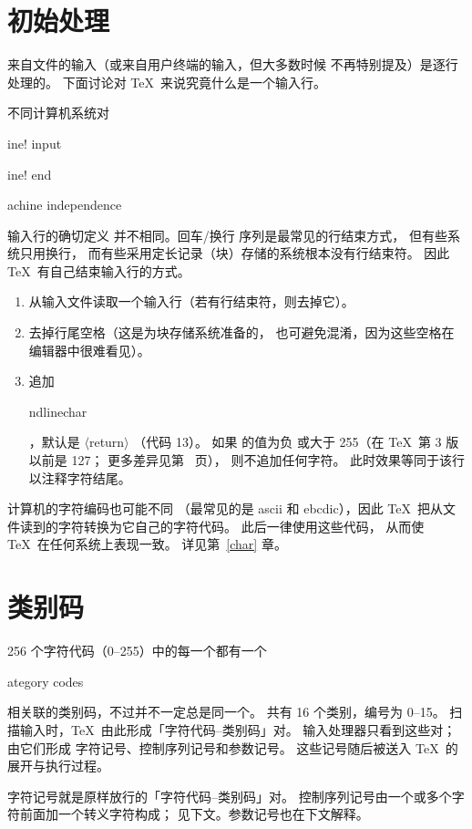 \documentclass[a4paper]{rapport3}
\makeatletter
\def\gr#1{$\langle$#1$\rangle$}\def\key#1{{\tt#1}}
\def\ascii{{\sc ascii}}
\def\ebcdic{{\sc ebcdic}}
\def\gram#1{\gr{#1}}%
\def\term#1\par{\index{#1}}
\def\cstoidx#1\par{\index{#1@\cs{#1}}}
\makeatother
\begin{document}
\section{初始处理}

来自文件的输入（或来自用户终端的输入，但大多数时候
不再特别提及）是逐行处理的。
下面讨论对 \TeX\ 来说究竟什么是一个输入行。

不同计算机系统对
\term line! input\par\term line! end\par\term machine independence\par
输入行的确切定义
\mdqon
并不相同。回车/换行
\mdqoff
\awp
{}%
序列是最常见的行结束方式，
但有些系统只用换行，
而有些采用定长记录（块）存储的系统根本没有行结束符。
因此 \TeX\ 有自己结束输入行的方式。

\begin{enumerate}
\item 从输入文件读取一个输入行（若有行结束符，则去掉它）。
\item 去掉行尾空格（这是为块存储系统准备的，
      也可避免混淆，因为这些空格在编辑器中很难看见）。
\item 追加 \cstoidx endlinechar\par，默认是 \gram{return}
      （代码 13）。
      如果  的值为负
\label{append:elc}%
      或大于 255（在 \TeX\ 第 3 版以前是 127；
      更多差异见第~\pageref{2vs3} 页），
      则不追加任何字符。
      此时效果等同于该行以注释字符结尾。
\end{enumerate}


计算机的字符编码也可能不同
（最常见的是 \ascii{} 和 \ebcdic{}），因此 \TeX\
把从文件读到的字符转换为它自己的字符代码。
此后一律使用这些代码，
从而使 \TeX\ 在任何系统上表现一致。
详见第~\ref{char} 章。

\section{类别码}

256 个字符代码（0--255）中的每一个都有一个
\term category codes\par
相关联的类别码，不过并不一定总是同一个。
共有 16 个类别，编号为 0--15。
扫描输入时，\TeX\ 由此形成「字符代码--类别码」对。
输入处理器只看到这些对；由它们形成
字符记号、控制序列记号和参数记号。
这些记号随后被送入 \TeX\ 的展开与执行过程。

字符记号就是原样放行的「字符代码--类别码」对。
控制序列记号由一个或多个字符前面加一个转义字符构成；
见下文。参数记号也在下文解释。
\end{document}

